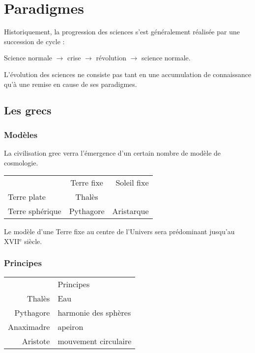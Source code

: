 
\section{Paradigmes}

Historiquement, la progression des sciences s'est généralement réalisée par une succession de cycle :
\begin{center}
Science normale $\to$ crise $\to$ révolution $\to$ science normale.
\end{center}
L'évolution des sciences ne consiste pas tant en une accumulation de connaissance qu'à une remise en cause de ses paradigmes.


  \subsection{Les grecs}
  \subsubsection{Modèles}

La civilisation grec verra l'émergence d'un certain nombre de modèle de cosmologie.


\begin{tabular}{lcr}
 & Terre fixe & Soleil fixe  \\
Terre plate & Thalès & \\
Terre sphérique & Pythagore & Aristarque \\
\end{tabular}

Le modèle d'une Terre fixe au centre de l'Univers sera prédominant jusqu'au {\footnotesize XVII}$^\text{e}$ siècle.


  \subsubsection{Principes}


\begin{tabular}{rl}
 & Principes \\
Thalès & Eau  \\
Pythagore & harmonie des sphères  \\
Anaximadre & apeiron \\
Aristote & mouvement circulaire \\
\end{tabular}

